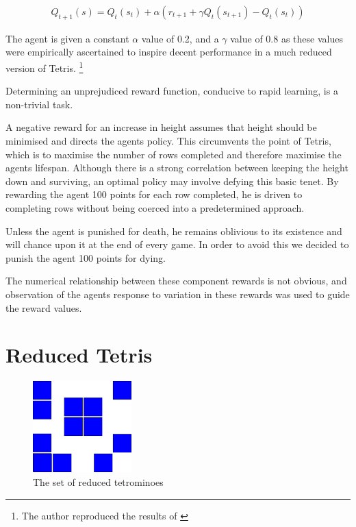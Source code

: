 \documentclass[a4paper,twocolumn]{article}
\begin{document}
\begin{eqnarray}
Q_{t+1}(s) = Q_{t}(s_{t}) + \alpha (r_{t+1} + \gamma Q_{t}(s_{t+1}) - Q_{t}(s_{t}) )
\end{eqnarray}

The agent is given a constant $\alpha$ value of 0.2, and a $\gamma$ value of 0.8 as these values were empirically ascertained to inspire decent performance in a much reduced version of Tetris. \footnote{The author reproduced the results of \cite{melaxtetris,yaeltetris}}

Determining an unprejudiced reward function, conducive to rapid learning, is a non-trivial task.

  A negative reward for an increase in height \citep{melaxtetris,yaeltetris} assumes that height should be minimised and directs the agents policy. This circumvents the point of Tetris, which is to maximise the number of rows completed and therefore maximise the agents lifespan. Although there is a strong correlation between keeping the height down and surviving, an optimal policy may involve defying this basic tenet. By rewarding the agent 100 points for each row completed, he is driven to completing rows without being coerced into a predetermined approach.

  Unless the agent is punished for death, he remains oblivious to its existence and will chance upon it at the end of every game. In order to avoid this we decided to punish the agent 100 points for dying.
  
     The numerical relationship between these component rewards is not obvious, and observation of the agents response to variation in these rewards was used to guide the reward values.
  
\section{Reduced Tetris}

\begin{figure}[h]
\centering
\includegraphics[width=1.5in]{reducedblocks.png}
\caption{The set of reduced tetrominoes}
\label{fig:redtet}
\end{figure}
\end{document}
